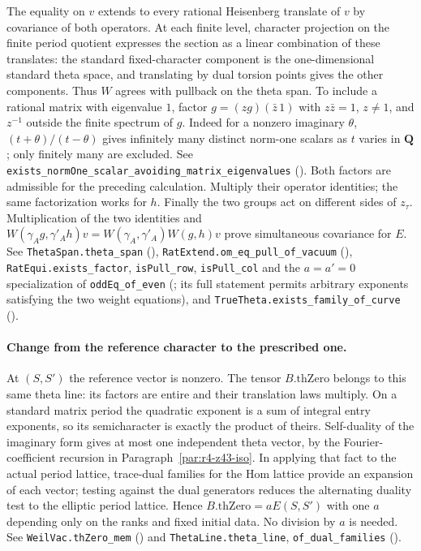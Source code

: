 The equality on $v$ extends to every rational Heisenberg translate of $v$
by covariance of both operators. At each finite level, character projection
on the finite period quotient expresses the section as a linear combination
of these translates: the standard fixed-character component is the
one-dimensional standard theta space, and translating by dual torsion
points gives the other components. Thus $W$ agrees with pullback on the
theta span. To include a rational matrix with eigenvalue $1$, factor
$g=(zg)(\bar z\,1)$ with $z\bar z=1$, $z\ne1$, and $z^{-1}$
outside the finite spectrum of $g$. Indeed for a nonzero imaginary
$\theta$, $(t+\theta)/(t-\theta)$ gives infinitely many distinct
norm-one scalars as $t$ varies in $\mathbf Q$; only finitely many are
excluded. See \nolinkurl{exists_normOne_scalar_avoiding_matrix_eigenvalues}
().
Both factors are admissible for the
preceding calculation. Multiply their operator identities; the same
factorization works for $h$. Finally the two groups act on different
sides of $z_\tau$. Multiplication of the two identities and
$W(\gamma_A g,\gamma'_A h)v=W(\gamma_A,\gamma'_A)W(g,h)v$
prove simultaneous covariance for $E$. See \nolinkurl{ThetaSpan.theta_span}
(),
\nolinkurl{RatExtend.om_eq_pull_of_vacuum}
(),
\nolinkurl{RatEqui.exists_factor}, \nolinkurl{isPull_row}, \nolinkurl{isPull_col}
and the $a=a'=0$ specialization of \nolinkurl{oddEq_of_even}
(; its full statement permits
arbitrary exponents satisfying the two weight equations),
and \nolinkurl{TrueTheta.exists_family_of_curve}
().

\paragraph{Change from the reference character to the prescribed one.}\label{r14:eq-normalize}
At $(S,S')$ the reference vector is nonzero. The tensor $B.\mathrm{thZero}$
belongs to this same theta line: its factors are entire and their
translation laws multiply. On a standard matrix period the quadratic
exponent is a sum of integral entry exponents, so its semicharacter is
exactly the product of theirs. Self-duality of the imaginary form gives
at most one independent theta vector, by the Fourier-coefficient
recursion in Paragraph~\ref{par:r4-z43-iso}. In applying that fact to
the actual period lattice, trace-dual families for the Hom lattice provide
an expansion of each vector; testing against the dual generators reduces
the alternating duality test to the elliptic period lattice. Hence
$B.\mathrm{thZero}=aE(S,S')$ with one $a$ depending only on the ranks
and fixed initial data. No division by $a$ is needed.
See \nolinkurl{WeilVac.thZero_mem}
() and \nolinkurl{ThetaLine.theta_line},
\nolinkurl{of_dual_families}
().


